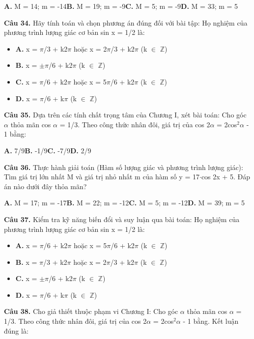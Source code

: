 \documentclass[11pt,a4paper]{article}
\begin{document}
\hspace*{1.5em}\textbf{A.} M = 14; m = -14\quad\quad \textbf{B.} M = 19; m = -9\quad\quad \textbf{C.} M = 5; m = -9\quad\quad \textbf{D.} M = 33; m = 5\par\vspace{2pt}
\textbf{\color{primary} Câu 34.} Hãy tính toán và chọn phương án đúng đối với bài tập: Họ nghiệm của phương trình lượng giác cơ bản sin x = 1/2 là:\par
\begin{itemize}\setlength{\itemsep}{1pt}\setlength{\parskip}{0pt}
  \item[] \textbf{A.} x = $\pi$/3 + k2$\pi$ hoặc x = 2$\pi$/3 + k2$\pi$ (k $\in$ $\mathbb{Z}$)
  \item[] \textbf{B.} x = $\pm$$\pi$/6 + k2$\pi$ (k $\in$ $\mathbb{Z}$)
  \item[] \textbf{C.} x = $\pi$/6 + k2$\pi$ hoặc x = 5$\pi$/6 + k2$\pi$ (k $\in$ $\mathbb{Z}$)
  \item[] \textbf{D.} x = $\pi$/6 + k$\pi$ (k $\in$ $\mathbb{Z}$)
\end{itemize}\vspace{2pt}
\textbf{\color{primary} Câu 35.} Dựa trên các tính chất trọng tâm của Chương I, xét bài toán: Cho góc $\alpha$ thỏa mãn cos $\alpha$ = 1/3. Theo công thức nhân đôi, giá trị của cos 2$\alpha$ = 2cos$^2$$\alpha$ - 1 bằng:\par
\hspace*{1.5em}\textbf{A.} 7/9\quad\quad \textbf{B.} -1/9\quad\quad \textbf{C.} -7/9\quad\quad \textbf{D.} 2/9\par\vspace{2pt}
\textbf{\color{primary} Câu 36.} Thực hành giải toán (Hàm số lượng giác và phương trình lượng giác): Tìm giá trị lớn nhất M và giá trị nhỏ nhất m của hàm số y = 17$\cdot$cos 2x + 5. Đáp án nào dưới đây thỏa mãn?\par
\hspace*{1.5em}\textbf{A.} M = 17; m = -17\quad\quad \textbf{B.} M = 22; m = -12\quad\quad \textbf{C.} M = 5; m = -12\quad\quad \textbf{D.} M = 39; m = 5\par\vspace{2pt}
\textbf{\color{primary} Câu 37.} Kiểm tra kỹ năng biến đổi và suy luận qua bài toán: Họ nghiệm của phương trình lượng giác cơ bản sin x = 1/2 là:\par
\begin{itemize}\setlength{\itemsep}{1pt}\setlength{\parskip}{0pt}
  \item[] \textbf{A.} x = $\pi$/6 + k2$\pi$ hoặc x = 5$\pi$/6 + k2$\pi$ (k $\in$ $\mathbb{Z}$)
  \item[] \textbf{B.} x = $\pi$/3 + k2$\pi$ hoặc x = 2$\pi$/3 + k2$\pi$ (k $\in$ $\mathbb{Z}$)
  \item[] \textbf{C.} x = $\pm$$\pi$/6 + k2$\pi$ (k $\in$ $\mathbb{Z}$)
  \item[] \textbf{D.} x = $\pi$/6 + k$\pi$ (k $\in$ $\mathbb{Z}$)
\end{itemize}\vspace{2pt}
\textbf{\color{primary} Câu 38.} Cho giả thiết thuộc phạm vi Chương I: Cho góc $\alpha$ thỏa mãn cos $\alpha$ = 1/3. Theo công thức nhân đôi, giá trị của cos 2$\alpha$ = 2cos$^2$$\alpha$ - 1 bằng. Kết luận đúng là:\par
\end{document}
